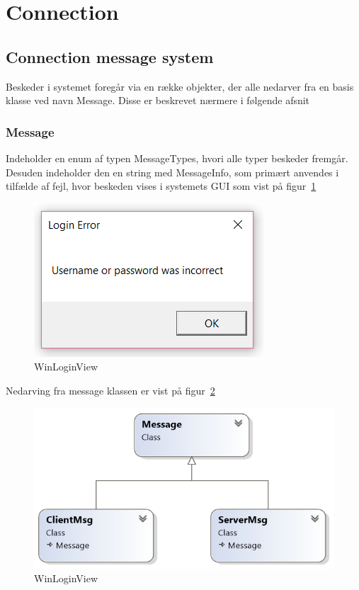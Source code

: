 \section{Connection}

\subsection{Connection message system}

Beskeder i systemet foregår via en række objekter, der alle nedarver fra en basis klasse ved navn Message. Disse er beskrevet nærmere i følgende afsnit

\subsubsection{Message}
Indeholder en enum af typen MessageTypes, hvori alle typer beskeder fremgår. Desuden indeholder den en string med MessageInfo, som primært anvendes i tilfælde af fejl, hvor beskeden vises i systemets GUI som vist på figur~\ref{fig:loginError}

\begin{figure}
	\centering
	\includegraphics[width=0.5\linewidth]{figs/connection/loginError.png}
	\caption{WinLoginView}
	\label{fig:loginError}
\end{figure}

Nedarving fra message klassen er vist på figur~\ref{fig:MessageUML}

\begin{figure}
	\centering
	\includegraphics[width=0.7\linewidth]{figs/connection/MessageUML.png}
	\caption{WinLoginView}
	\label{fig:MessageUML}
\end{figure}

